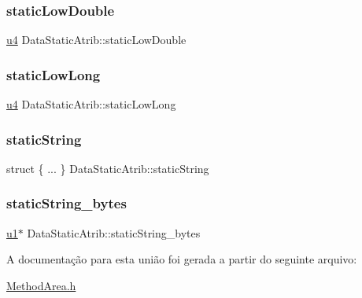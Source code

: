 \subsubsection{\texorpdfstring{static\+Low\+Double}{staticLowDouble}}
{\footnotesize\ttfamily \hyperlink{ClassLoader_8h_aedf6ddc03df8caaaccbb4c60b9a9b850}{u4} Data\+Static\+Atrib\+::static\+Low\+Double}

\mbox{\label{unionDataStaticAtrib_aa04959b5aa4875d47c56624692ce0bb3}} 
\subsubsection{\texorpdfstring{static\+Low\+Long}{staticLowLong}}
{\footnotesize\ttfamily \hyperlink{ClassLoader_8h_aedf6ddc03df8caaaccbb4c60b9a9b850}{u4} Data\+Static\+Atrib\+::static\+Low\+Long}

\mbox{\label{unionDataStaticAtrib_a52df35cc32dea60d688d6f3819d250b6}} 
\subsubsection{\texorpdfstring{static\+String}{staticString}}
{\footnotesize\ttfamily struct \{ ... \}  Data\+Static\+Atrib\+::static\+String}

\mbox{\label{unionDataStaticAtrib_ab578dc394ef2a6b255e56724317bfb0a}} 
\subsubsection{\texorpdfstring{static\+String\+\_\+bytes}{staticString\_bytes}}
{\footnotesize\ttfamily \hyperlink{ClassLoader_8h_a216a9f8b04b4f0af84a4ca9d1d85a6ca}{u1}$\ast$ Data\+Static\+Atrib\+::static\+String\+\_\+bytes}



A documentação para esta união foi gerada a partir do seguinte arquivo\+:\begin{DoxyCompactItemize}
\item 
\hyperlink{MethodArea_8h}{Method\+Area.\+h}\end{DoxyCompactItemize}
